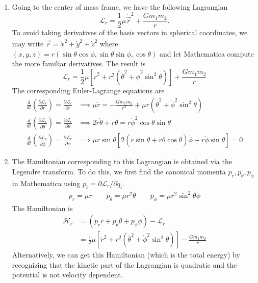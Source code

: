 \documentclass{article}
\theoremstyle{definition}
\newcommand{\p}{\partial}
\newcommand{\lag}{\mathcal{L}}
\newcommand{\ham}{\mathcal{H}}
\newcommand{\f}[2]{\frac{#1}{#2}}
\newcommand{\lp}{\left(}
\newcommand{\rp}{\right)}
\newcommand{\lb}{\left[}
\newcommand{\rb}{\right]}
\begin{document}
\begin{enumerate}[label=(\alph*)]
	
	\item Going to the center of mass frame, we have the following Lagrangian
	\begin{equation*}
	\lag_r = \f{1}{2} \mu \dot{\vec{r}}^2 + \f{Gm_1m_2}{r}.
	\end{equation*}
	To avoid taking derivatives of the basis vectors in spherical coordinates, we may write $\dot{\vec{r}} = \dot{x}^2 + \dot{y}^2 + \dot{z}^2$ where $(x,y,z) = r(\sin\theta\cos\phi, \sin\theta\sin\phi, \cos\theta)$ and let Mathematica compute the more familiar derivatives. The result is 
	\begin{equation*}
	\boxed{\lag_r = \f{1}{2}\mu \lb  \dot{r}^2 + r^2\lp\dot{\theta}^2 + \dot{\phi}^2\sin^2\theta \rp  \rb + \f{Gm_1m_2}{r}}
	\end{equation*}
	The corresponding Euler-Lagrange equations are
	\begin{align*}
	\f{d}{dt}\lp \f{\p \lag_r}{\p \dot{r}}\rp = \f{\p \lag_r}{\p r}  
	&\implies 
	\mu \ddot{r} = -\f{G m_1 m_2}{r^2} + \mu r\lp\dot{\theta}^2 + \dot{\phi}^2\sin^2\theta\rp\\
	\f{d}{dt}\lp \f{\p \lag_r}{\p \dot{\theta}}\rp = \f{\p \lag_r}{\p \theta}  
	&\implies 
	2\dot{r}\dot{\theta} + r\ddot{\theta} = r\dot{\phi}^2\cos\theta \sin\theta \\
	\f{d}{dt}\lp \f{\p \lag_r}{\p \dot{\phi}}\rp = \f{\p \lag_r}{\p \phi} 
	&\implies 
	\mu r \sin\theta \lb 2\lp \dot{r}\sin\theta  + r \dot{\theta} \cos\theta \rp \dot{\phi} + r \ddot{\phi} \sin\theta \rb =0
	\end{align*}
	
	\item The Hamiltonian corresponding to this Lagrangian is obtained via the Legendre transform. To do this, we first find the canonical momenta $p_r, p_\theta, p_\phi$ in Mathematica using $p_i = \p \lag_r/ \p \dot{q}_i$. 
	\begin{align*}
	p_r = \mu \dot{r} \quad\quad p_\theta = \mu r^2 \dot{\theta} \quad\quad p_\phi = \mu r^2\sin^2\theta \dot{\phi}
	\end{align*}
	The Hamiltonian is 
	\begin{align*}
	\ham_r &= \lp p_r \dot{r} + p_\theta \dot{\theta} + p_\phi \dot{\phi} \rp - \lag_r \\
	&= \boxed{\f{1}{2}\mu \lb \dot{r}^2 + r^2 \lp \dot{\theta}^2+ \dot{\phi}^2\sin^2\theta  \rp \rb - \f{Gm_1m_2}{r}}
	\end{align*}
	Alternatively, we can get this Hamiltonian (which is the total energy) by recognizing that the kinetic part of the Lagrangian is quadratic and the potential is not velocity dependent. \\
	

\end{enumerate}
\end{document}
